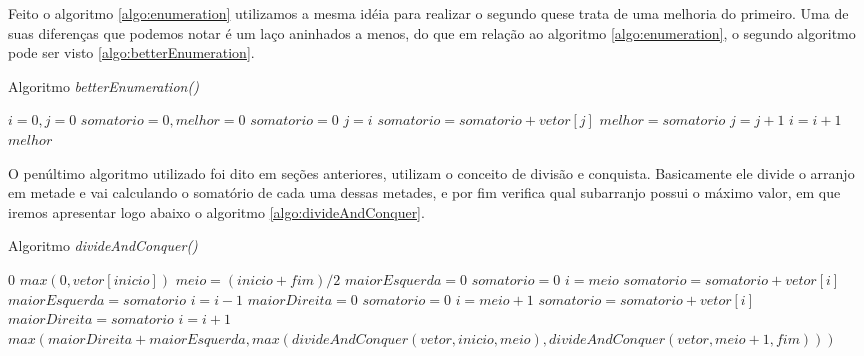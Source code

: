 \documentclass[
	12pt,				%
	oneside,   	        %
	a4paper,			%
	english,			%
	french,				%
	spanish,			%
	brazil,				%
	]{pacotes/abntex2}
\begin{document}
Feito o algoritmo \ref{algo:enumeration} utilizamos a mesma idéia para realizar o segundo quese trata de  uma melhoria do primeiro. Uma de suas diferenças que podemos notar é um laço aninhados a menos, do que em relação ao algoritmo \ref{algo:enumeration}, o segundo algoritmo pode ser visto \ref{algo:betterEnumeration}. 

\begin{algorithm}[!htb]
\caption{Algoritmo \textit{betterEnumeration()}}
\label{algo:betterEnumeration}
\begin{algorithmic}[1]
        \State  $i = 0, j = 0$
        \State  $somatorio = 0, melhor = 0$
            \State $somatorio = 0$
            \State $j = i$
                \State $somatorio = somatorio + vetor[j] $
                    \State  $melhor = somatorio$
                \EndIf
                \State $j = j + 1$
            \EndWhile
            \State $i = i + 1$
        \EndWhile
        \State \Return $melhor$
    \EndFunction
\end{algorithmic}
\end{algorithm}

O penúltimo algoritmo utilizado foi dito em seções anteriores, utilizam o conceito de divisão e conquista. Basicamente ele divide o arranjo em metade e vai calculando o somatório de cada uma dessas metades, e por fim verifica qual subarranjo possui o máximo valor, em que iremos apresentar logo abaixo o algoritmo \ref{algo:divideAndConquer}.

\begin{algorithm}[!htb]
\caption{Algoritmo \textit{divideAndConquer()}}
\label{algo:divideAndConquer}
\begin{algorithmic}[1]
            \State \Return $0$
        \EndIf
           \State \Return $max(0, vetor[inicio])$
        \EndIf
        \State  $meio = (inicio+fim) / 2$
        \State  $maiorEsquerda = 0$
        \State  $somatorio = 0$
        \State  $i = meio$
            \State $somatorio = somatorio + vetor[i] $
                \State $maiorEsquerda = somatorio$
            \EndIf
            \State $i = i - 1$
        \EndWhile
        \State  $maiorDireita = 0$
        \State  $somatorio = 0$
        \State  $i = meio + 1$
            \State $somatorio = somatorio + vetor[i] $
                \State $maiorDireita = somatorio$
            \EndIf
            \State $i = i + 1$
        \EndWhile
        \State \Return $max(maiorDireita + maiorEsquerda, max(divideAndConquer(vetor, inicio, meio), divideAndConquer(vetor, meio + 1, fim)))$
    \EndFunction
\end{algorithmic}
\end{algorithm}
\end{document}
